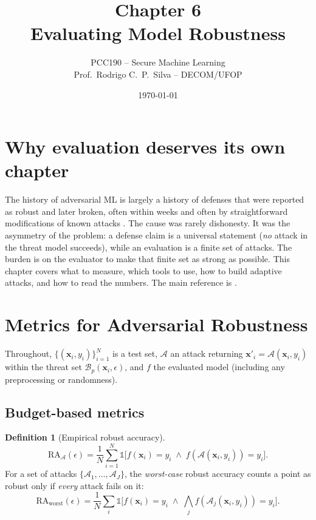 \documentclass[10pt,a4paper]{extarticle}
\title{Chapter 6\\Evaluating Model Robustness}
\author{PCC190 -- Secure Machine Learning\\Prof.\ Rodrigo C.\ P.\ Silva -- DECOM/UFOP}
\date{\today}
\theoremstyle{definition}
\newtheorem{definition}{Definition}[section]
\newcommand{\x}{\mathbf{x}}
\newcommand{\xadv}{\mathbf{x}'}
\newcommand{\B}{\mathcal{B}}
\begin{document}
\maketitle
\thispagestyle{fancy}
\tableofcontents

\section*{Why evaluation deserves its own chapter}

The history of adversarial ML is largely a history of defenses that were reported as robust and later broken, often within weeks and often by straightforward modifications of known attacks \citep{carlini2017detected,athalye2018obfuscated,tramer2020adaptive}. The cause was rarely dishonesty. It was the asymmetry of the problem: a defense claim is a universal statement (\emph{no} attack in the threat model succeeds), while an evaluation is a finite set of attacks. The burden is on the evaluator to make that finite set as strong as possible. This chapter covers what to measure, which tools to use, how to build adaptive attacks, and how to read the numbers. The main reference is \citet{carlini2019evaluating}.

\section{Metrics for Adversarial Robustness}

Throughout, \(\{(\x_i,y_i)\}_{i=1}^{N}\) is a test set, \(\mathcal{A}\) an attack returning \(\xadv_i=\mathcal{A}(\x_i,y_i)\) within the threat set \(\B_p(\x_i,\epsilon)\), and \(f\) the evaluated model (including any preprocessing or randomness).

\subsection{Budget-based metrics}

\begin{definition}[Empirical robust accuracy]
\[
\mathrm{RA}_{\mathcal{A}}(\epsilon)=\frac{1}{N}\sum_{i=1}^{N}\mathbb{1}\big[f(\x_i)=y_i\;\wedge\;f(\mathcal{A}(\x_i,y_i))=y_i\big].
\]
For a set of attacks \(\{\mathcal{A}_1,\dots,\mathcal{A}_J\}\), the \emph{worst-case} robust accuracy counts a point as robust only if \emph{every} attack fails on it:
\[
\mathrm{RA}_{\text{worst}}(\epsilon)=\frac{1}{N}\sum_{i}\mathbb{1}\Big[f(\x_i)=y_i\;\wedge\;\textstyle\bigwedge_{j}f(\mathcal{A}_j(\x_i,y_i))=y_i\Big].
\]
\end{definition}
\end{document}
